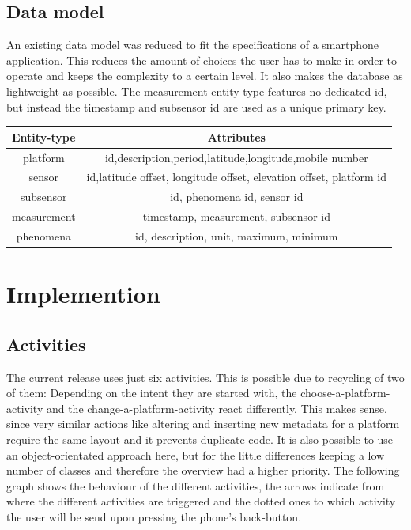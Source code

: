 \documentclass[11pt,oneside,a4paper]{scrartcl}
\begin{document}
\subsection{Data model}
An existing data model\cite{websense2011} was reduced to fit the specifications of a smartphone application. This reduces the amount of choices the user has to make in order to operate and keeps the complexity to a certain level. It also makes the database as lightweight as possible. The measurement entity-type features no dedicated id, but instead the timestamp and subsensor id are used as a unique primary key.

\begin{center}
\begin{tabular}{|c|c|}
\hline \textbf{ Entity-type} &  \textbf{Attributes} \\ 
\hline platform & id,description,period,latitude,longitude,mobile number \\ 
\hline sensor & id,latitude offset, longitude offset, elevation offset, platform id \\ 
\hline subsensor & id, phenomena id, sensor id \\ 
\hline measurement & timestamp, measurement, subsensor id \\ 
\hline phenomena & id, description, unit, maximum, minimum \\ 
\hline 
\end{tabular} 
\end{center}


\section{Implemention}
\subsection{Activities}
The current release uses just six activities. This is possible due to recycling of two of them: Depending on the intent they are started with, the choose-a-platform-activity and the change-a-platform-activity react differently. This makes sense, since very similar actions like altering and inserting new metadata for a platform require the same layout and it prevents duplicate code. It is also possible to use an object-orientated approach here, but for the little differences keeping a low number of classes and therefore the overview had a higher priority.
The following graph shows the behaviour of the different activities, the arrows indicate from where the different activities are triggered and the dotted ones to which activity the user will be send upon pressing the phone's back-button.
\end{document}
